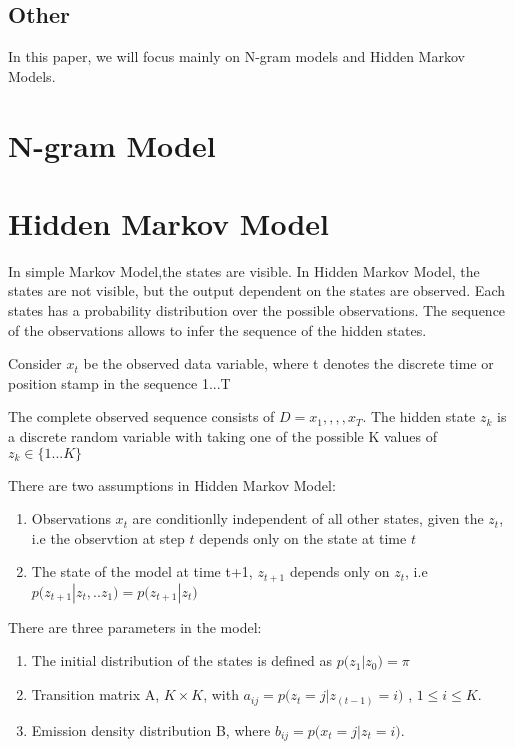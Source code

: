 \documentclass{article} %
\begin{document}
\subsection{Other}

In this paper, we will focus mainly on N-gram models and Hidden Markov Models.

\section{N-gram Model}
\label{N-Gram Model}

\section{Hidden Markov Model}
\label{HMM}

In simple Markov Model,the states are visible. In Hidden Markov Model, the states are not visible, but the output dependent on the states are observed. Each states has a probability distribution over the possible observations. The sequence of the observations allows to infer the sequence of the hidden states. 

Consider \(x_t\) be the observed data variable, where t denotes the discrete time or position stamp in the sequence 1...T

The complete observed sequence consists of \(D ={x_1,,,,x_T}\). The hidden state \(z_k\) is a discrete random variable with taking one of the possible K values of \(z_k \in \{1...K\}\)

There are two assumptions in Hidden Markov Model:
\begin{enumerate}
\item Observations $x_t$ are conditionlly independent of all other states, given the \(z_t\), i.e the observtion at step \(t\) depends only on the state at time \(t\)
\item The state of the model at time t+1, \(z_{t+1}\) depends only on \(z_t\), i.e 
\( p\big(z_{t+1}|z_t,..z_1\big) = p\big(z_{t+1}|z_t\big) \)
\end{enumerate}

There are three parameters in the model:
\begin{enumerate}
\item The initial distribution of the states is defined as \(p\big(z_1|z_0 \big) = \pi\)
\item Transition matrix A, \(K \times K \), with \(a_{ij} = p\big(z_t=j|z_(t-1)=i\big)\) , \(1\leq i \leq K \).
\item Emission density distribution B, where \(b_{ij} = p\big(x_t=j|z_t=i\big)\).
\end{enumerate}
\end{document}
